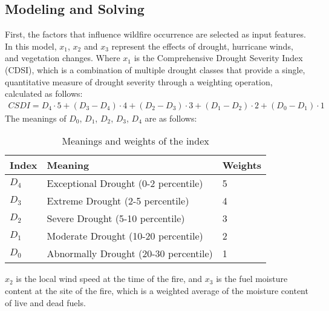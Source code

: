 \documentclass[12pt]{article}  %
\begin{document}
  \subsection{Modeling and Solving}
  First, the factors that influence wildfire occurrence are selected as input features. In this model, $x_1$, $x_2$ and $x_3$ represent the effects of drought, hurricane winds, and vegetation changes. Where $x_1$ is the Comprehensive Drought Severity Index (CDSI), which is a combination of multiple drought classes that provide a single, quantitative measure of drought severity through a weighting operation, calculated as follows:
  \begin{equation}
  	\begin{aligned}
  		CSDI = D_4 \cdot 5 + (D_3-D_4)\cdot 4 + (D_2-D_3)\cdot 3 + (D_1-D_2)\cdot 2 + (D_0-D_1)\cdot 1
  	\end{aligned}
  \end{equation}
  The meanings of $D_0$, $D_1$, $D_2$, $D_3$, $D_4$ are as follows:
  
  \begin{table}[htbp]
  	\begin{center}
  		\caption{Meanings and weights of the index}
  		\begin{tabular}{m{1.5cm} m{7cm}m{1cm}}
  			\toprule[2pt]
  			\multicolumn{1}{m{2cm}}{\centering Index}
  			&\multicolumn{1}{m{7cm}}{\centering Meaning }
  			&\multicolumn{1}{m{2cm}}{\centering Weights }\\
  			\midrule
  			$D_4$& Exceptional Drought (0-2 percentile) & 5 \\
  			\vspace{2pt}
  			$D_3$& Extreme Drought (2-5 percentile) & 4\\
  			\vspace{2pt}
  			$D_2$& Severe Drought (5-10 percentile) & 3\\
  			\vspace{2pt}
  			$D_1$& Moderate Drought (10-20 percentile) & 2\\
  			\vspace{2pt}
  			$D_0$& Abnormally Drought (20-30 percentile) & 1\\
  			
  			
  			\bottomrule[2pt]
  		\end{tabular}
  	\end{center}
  \end{table}
  \vspace{-0.5cm}
  $x_2$ is the local wind speed at the time of the fire, and $x_3$ is the fuel moisture content at the site of the fire, which is a weighted average of the moisture content of live and dead fuels.
  
\end{document}
